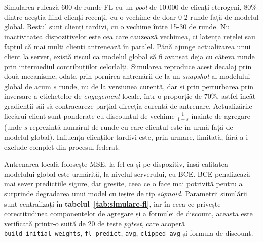\documentclass[12pt,a4paper]{report}
\begin{document}
Simularea rulează 600 de runde FL cu un \textit{pool} de 10.000 de clienți eterogeni, 80\% dintre aceștia fiind clienți recenți, cu o vechime de doar 0-2 runde față de modelul global. Restul sunt clienți tardivi, cu o vechime între 15-30 de runde. Nu inactivitatea dispozitivelor este cea care cauzează vechimea, ci latența rețelei sau faptul că mai mulți clienți antrenează în paralel. Până ajunge actualizarea unui client la server, există riscul ca modelul global să fi avansat deja cu câteva runde prin intermediul contribuțiilor celorlalți. Simularea reproduce acest decalaj prin două mecanisme, odată prin pornirea antrenării de la un \textit{snapshot} al modelului global de acum $s$ runde, nu de la versiunea curentă, dar și prin perturbarea prin inversare a etichetelor de \textit{engagement} locale, într-o proporție de 70\%, astfel încât gradienții săi să contracareze parțial direcția curentă de antrenare. Actualizările fiecărui client sunt ponderate cu discountul de vechime $\frac{1}{1+s}$ înainte de agregare (unde $s$ reprezintă numărul de runde cu care clientul este în urmă față de modelul global). Influența clienților tardivi este, prin urmare, limitată, fără a-i exclude complet din procesul federat.

Antrenarea locală folosește MSE, la fel ca și pe dispozitiv, însă calitatea modelului global este urmărită, la nivelul serverului, cu BCE. BCE penalizează mai sever predicțiile sigure, dar greșite, ceea ce o face mai potrivită pentru a surprinde degradarea unui model cu ieșire de tip \textit{sigmoid}. Parametrii simulării sunt centralizați în \textbf{tabelul~\ref{tab:simulare-fl}}, iar în ceea ce privește corectitudinea componentelor de agregare și a formulei de discount, aceasta este verificată printr-o suită de 20 de teste \textit{pytest}, care acoperă \texttt{build\_initial\_weights}, \texttt{fl\_predict}, \texttt{avg}, \texttt{clipped\_avg} și formula de discount.
\end{document}
